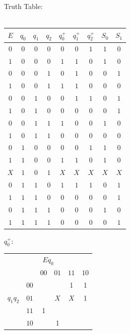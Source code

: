 \documentclass[11pt]{article}
\begin{document}
\begin{multicols}{2}


Truth Table: \\
 ~\\
\begin{tabular}{|cccc|ccc|cc|}
\hline
$E$ & $q_0$ & $q_1$ & $q_2$ & $q_0^+$ & $q_1^+$ & $q_2^+$ & $S_0$ & $S_1$ \\
\hline
$0$ & $0$ & $0$ & $0$ &    $0$ & $0$ & $1$ &    $1$ & $0$  \\
$1$ & $0$ & $0$ & $0$ &    $1$ & $1$ & $0$ &    $1$ & $0$  \\
\hline
$0$ & $0$ & $0$ & $1$ &    $0$ & $1$ & $0$ &    $0$ & $1$  \\
$1$ & $0$ & $0$ & $1$ &    $1$ & $1$ & $0$ &    $0$ & $0$  \\
\hline
$0$ & $0$ & $1$ & $0$ &    $0$ & $1$ & $1$ &    $0$ & $1$  \\
$1$ & $0$ & $1$ & $0$ &    $0$ & $0$ & $0$ &    $0$ & $1$  \\
\hline
$0$ & $0$ & $1$ & $1$ &    $1$ & $0$ & $0$ &    $1$ & $0$  \\
$1$ & $0$ & $1$ & $1$ &    $0$ & $0$ & $0$ &    $0$ & $0$  \\
\hline
$0$ & $1$ & $0$ & $0$ &    $0$ & $0$ & $1$ &    $1$ & $0$  \\
$1$ & $1$ & $0$ & $0$ &    $1$ & $1$ & $0$ &    $1$ & $0$  \\
\hline
$$X$$ & $1$ & $0$ & $1$ &    $$X$$ & $$X$$ & $$X$$ &    $$X$$ & $$X$$  \\
\hline
$0$ & $1$ & $1$ & $0$ &    $1$ & $1$ & $1$ &    $0$ & $1$  \\
$1$ & $1$ & $1$ & $0$ &    $0$ & $0$ & $0$ &    $0$ & $1$  \\
\hline
$0$ & $1$ & $1$ & $1$ &    $0$ & $0$ & $0$ &    $1$ & $0$  \\
$1$ & $1$ & $1$ & $1$ &    $0$ & $0$ & $0$ &    $0$ & $1$  \\
\hline
\end{tabular}

$q_0^+$:
\begin{tabular}{|cc|c|c|c|c|}
\hline
\multicolumn{6}{|c|}{$E q_0$ } \\
           & & \tiny{$00$} & \tiny{$01$}  & \tiny{$11$}  & \tiny{$10$}  \\
           & \tiny{$00$} &   &   & 1 & 1 \\
$q_1 q_2$  & \tiny{$01$} &   & $X$ & $X$ & 1 \\
           & \tiny{$11$} & 1 &   &   &   \\
           & \tiny{$10$} &   & 1 &   &   \\
\hline
\end{tabular}


\end{multicols}
\end{document}
